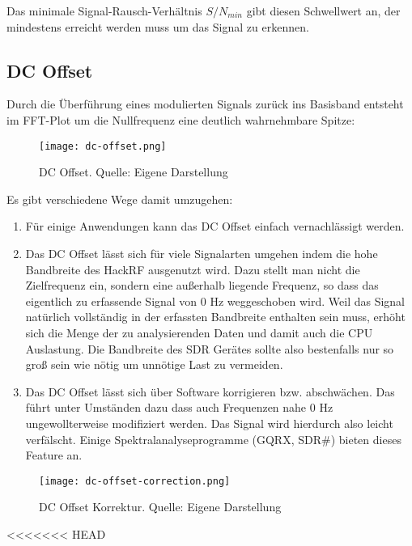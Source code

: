 Das minimale Signal-Rausch-Verhältnis \(S/N_{min}\) gibt diesen Schwellwert an, der mindestens erreicht werden muss um das Signal zu erkennen. 

\subsection{DC Offset}
Durch die Überführung eines modulierten Signals zurück ins Basisband entsteht im FFT-Plot um die Nullfrequenz eine deutlich wahrnehmbare Spitze:
\begin{figure}[ht]
	\centering
	\texttt{[image: dc-offset.png]}
	\caption[DC Offset]{DC Offset. Quelle: Eigene Darstellung} 
	\label{dc-offset}
\end{figure}

Es gibt verschiedene Wege damit umzugehen:
\begin{enumerate}
	\item Für einige Anwendungen kann das DC Offset einfach vernachlässigt werden.
	\item Das DC Offset lässt sich für viele Signalarten umgehen indem die hohe Bandbreite des HackRF ausgenutzt wird. 
	Dazu stellt man nicht die Zielfrequenz ein, sondern eine außerhalb liegende Frequenz, so dass das eigentlich zu erfassende Signal von 0 Hz  weggeschoben wird. Weil das Signal natürlich vollständig in der erfassten Bandbreite enthalten sein muss, erhöht sich die Menge der zu analysierenden Daten und damit auch die CPU Auslastung. Die Bandbreite des SDR Gerätes sollte also bestenfalls nur so groß sein wie nötig um unnötige Last zu vermeiden.
	\item Das DC Offset lässt sich über Software korrigieren bzw. abschwächen. Das führt unter Umständen dazu dass auch Frequenzen nahe 0 Hz ungewollterweise modifiziert werden. Das Signal wird hierdurch also leicht verfälscht. Einige Spektralanalyseprogramme (GQRX, SDR\#) bieten dieses Feature an.
\end{enumerate}

\begin{figure}[ht]
	\centering
	\texttt{[image: dc-offset-correction.png]}
	\caption[DC Offset Korrektur]{DC Offset Korrektur. Quelle: Eigene Darstellung} 
	\label{dc-offset-correction}
\end{figure}



<<<<<<< HEAD

